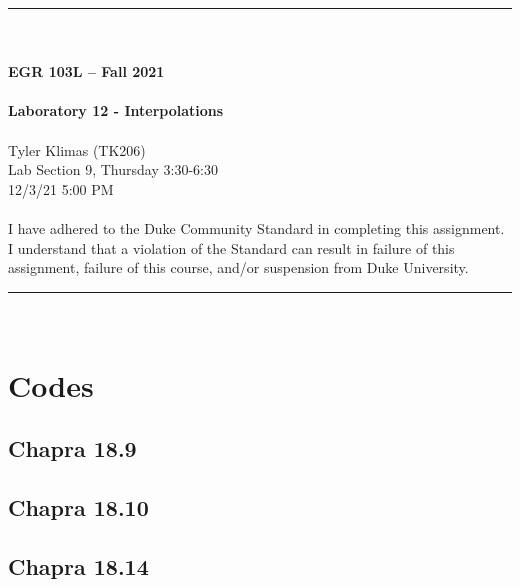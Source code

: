 \documentclass{article}
\begin{document}
\begin{center}
\rule{6.5in}{0.5mm}\\~\\
\textbf{\large EGR 103L -- Fall 2021}\\~\\
\textbf{\huge Laboratory 12 - Interpolations}\\~\\
Tyler Klimas (TK206)\\
Lab Section 9, Thursday 3:30-6:30\\
12/3/21 5:00 PM\\~\\
{\small I have adhered to the Duke Community Standard in completing this assignment.  I understand that a violation of the Standard can result in failure of this assignment, failure of this course, and/or suspension from Duke University.} 
\rule{6.5in}{0.5mm}\\
\end{center}
\tableofcontents
\listoffigures
\clearpage

\appendix
\section{Codes}
\lstset{style=python103, language=python} 

\subsection{Chapra 18.9}

\clearpage 

\subsection{Chapra 18.10}

\clearpage

\subsection{Chapra 18.14}

\clearpage
\end{document}
